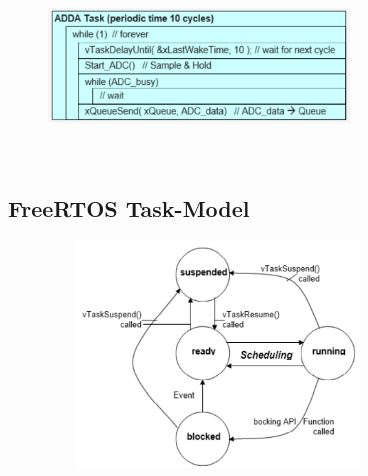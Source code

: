  	\begin{figure}[h]
    \centering
    \includegraphics[width=8cm, height=5cm]{Images/image131.png}
    \label{fig:Fig 81}
    \end{figure}
\newpage

\subsection{ FreeRTOS Task-Model}

 	\begin{figure}[h]
    \centering
    \includegraphics[width=9cm, height=6cm]{Images/image132.png}
    \label{fig:Fig 82}
    \end{figure}

